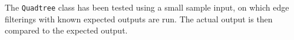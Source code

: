 The \texttt{Quadtree} class has been tested using a small sample input, on which edge filterings with known expected outputs are run. The actual output is then compared to the expected output. \\ \\

